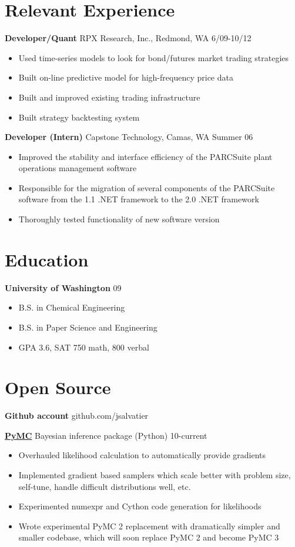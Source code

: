\documentclass[margin]{res}
\newcommand{\bactivity}[3]{
  {\bf #1} #2 \hfill #3
    \vspace{6pt}
    \begin{itemize} \itemsep -2pt
      }
\newcommand{\eactivity}[0]{\end{itemize}}
\begin{document}
 
 
\begin{resume} 
 

\section{Relevant Experience}
  \bactivity{Developer/Quant}{RPX Research, Inc., Redmond, WA}{6/09-10/12}
     \item Used time-series models to look for bond/futures market trading strategies 
     \item Built on-line predictive model for high-frequency price data 
     \item Built and improved existing trading infrastructure
     \item Built strategy backtesting system
  \eactivity

    \bactivity{Developer (Intern)}{Capstone Technology, Camas, WA}{Summer 06}
    \item Improved the stability and interface efficiency of the PARCSuite plant operations management software 
    \item Responsible for the migration of several components of the PARCSuite software from the 1.1 .NET framework to the 2.0 .NET framework 
    \item Thoroughly tested functionality of new software version 
  \eactivity

 \section{Education} 
  \bactivity{University of Washington}{}{09}
      \item B.S. in Chemical Engineering
      \item B.S. in Paper Science and Engineering
      \item GPA 3.6, SAT 750 math, 800 verbal
  \eactivity
  
 \section{Open Source}
    {\bf Github account} github.com/jsalvatier 

    \bactivity{\href{https://github.com/pymc-devs/pymc\#readme}{PyMC} }{Bayesian inference package (Python)}{10-current}
      \item Overhauled likelihood calculation to automatically provide gradients 
      \item Implemented gradient based samplers which scale better with problem size, self-tune, handle difficult distributions well, etc.
      \item Experimented numexpr and Cython code generation for likelihoods
      \item Wrote experimental PyMC 2 replacement with dramatically simpler and smaller codebase, which will soon replace PyMC 2 and become PyMC 3
    \eactivity


\end{resume}
\end{document}
